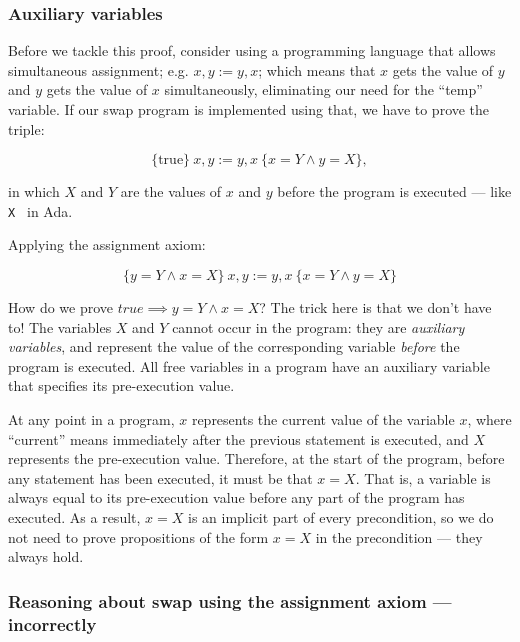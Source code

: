 \subsubsection*{Auxiliary variables}

Before we tackle this proof, consider using a programming language that allows simultaneous assignment; e.g. $x, y := y, x$; which means that $x$ gets the value of $y$ and $y$ gets the value of $x$ simultaneously, eliminating our need for the ``temp'' variable. If our swap program is implemented using that, we have to prove the triple:

\begin{displaymath}
\{ \textrm{true} \}~ x, y := y, x~ \{x = Y \land y = X \},
\end{displaymath}

in which $X$ and $Y$ are the values of $x$ and $y$ before the program is executed --- like \texttt{X~} in Ada.

Applying the assignment axiom:

\begin{displaymath}
\{ y = Y \land x = X \}~ x, y := y, x~ \{x = Y \land y = X \}
\end{displaymath}

How do we prove $true \implies y = Y \land x = X$? The trick here is that we don't have to! The variables $X$ and $Y$ cannot occur in the program: they are {\em auxiliary variables}, and represent the value of the corresponding variable \emph{before} the program is executed. All free variables in a program have an auxiliary variable that specifies its pre-execution value. 

At any point in a program, $x$ represents the current value of the variable $x$, where ``current'' means immediately after the previous statement is executed, and $X$ represents the pre-execution value. Therefore, at the start of the program, before any statement has been executed, it must be that $x = X$. That is, a variable is always equal to its pre-execution value before any part of the program has executed. As a result, $x = X$ is an implicit part of every precondition, so we do not need to prove propositions of the form $x = X$ in the precondition --- they always hold.


\subsubsection*{Reasoning about swap using the assignment axiom --- incorrectly}

